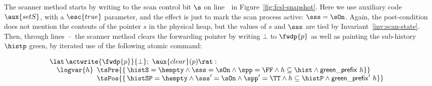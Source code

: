 The scanner method starts by writing to the scan control bit $\s$ on
line~\lineScanSetsS\ in Figure~\ref{fig:fcsl-snapshot}. Here we use
auxiliary code $\aux{setS}$, with a $\esc{true}$ parameter, and the
effect is just to mark the scan process active: $\sss = \sOn$. Again,
the post-condition does not mention the contents of the pointer $s$ in
the physical heap, but the values of $s$ and $\sss$ are tied by
Invariant~\ref{inv:scan-state}. Then, through
lines~\lineScanClearsX--\lineScanClearsY~the scanner method clears the
forwarding pointer by writing $\bot$ to $\fwdp{p}$ as well as painting
the sub-history $\histp$ green, by iterated use of the following
atomic command:

\[
\!\begin{array}{l}
   \lat\,\actwrite{\fwdp{p}}{\bot};\ \aux{clear}(p)\rat :\\
   ~~~  \logvar{h}
   \begin{array}[t]{l}
     \tsPre{\{\, \histS = \hempty \wedge \sss= \sOn \wedge \spp = \FF
       \wedge h \subseteq \hist \wedge \greenH\ h \}}\\
     \tsPos{\{\, \histSP = \hempty \wedge \sss'= \sOn \wedge
       \spp' = \TT \wedge h \subseteq \histP \wedge \greenH'\ h\}}\\
   \end{array}
\end{array}
\]

